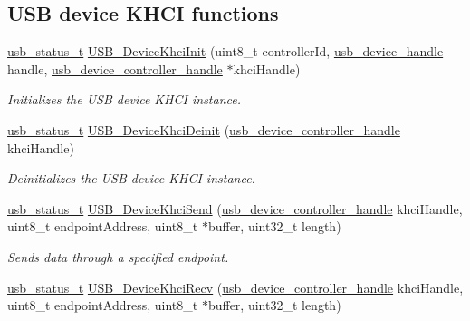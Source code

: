 \subsection*{U\-S\-B device K\-H\-C\-I functions}
\begin{DoxyCompactItemize}
\item 
\hyperlink{group__usb__drv_ga3172b9f50553fb6d8aa2823d10a39c58}{usb\-\_\-status\-\_\-t} \hyperlink{group__usb__device__controller__khci__driver_gad9e6ecba752b0253547e3d57b7b8ea15}{U\-S\-B\-\_\-\-Device\-Khci\-Init} (uint8\-\_\-t controller\-Id, \hyperlink{group__usb__drv_gae62132dc6e5eba994f8aa56cb7399abc}{usb\-\_\-device\-\_\-handle} handle, \hyperlink{group__usb__device__controller__driver_gaec03ce2e4732aa876cd2a91cf8e93b5b}{usb\-\_\-device\-\_\-controller\-\_\-handle} $\ast$khci\-Handle)
\begin{DoxyCompactList}\small\item\em Initializes the U\-S\-B device K\-H\-C\-I instance. \end{DoxyCompactList}\item 
\hyperlink{group__usb__drv_ga3172b9f50553fb6d8aa2823d10a39c58}{usb\-\_\-status\-\_\-t} \hyperlink{group__usb__device__controller__khci__driver_gaeca0b3ce2863e004da6f749ebaeed21d}{U\-S\-B\-\_\-\-Device\-Khci\-Deinit} (\hyperlink{group__usb__device__controller__driver_gaec03ce2e4732aa876cd2a91cf8e93b5b}{usb\-\_\-device\-\_\-controller\-\_\-handle} khci\-Handle)
\begin{DoxyCompactList}\small\item\em Deinitializes the U\-S\-B device K\-H\-C\-I instance. \end{DoxyCompactList}\item 
\hyperlink{group__usb__drv_ga3172b9f50553fb6d8aa2823d10a39c58}{usb\-\_\-status\-\_\-t} \hyperlink{group__usb__device__controller__khci__driver_gae85f89ac73253f83952f2a2b04211932}{U\-S\-B\-\_\-\-Device\-Khci\-Send} (\hyperlink{group__usb__device__controller__driver_gaec03ce2e4732aa876cd2a91cf8e93b5b}{usb\-\_\-device\-\_\-controller\-\_\-handle} khci\-Handle, uint8\-\_\-t endpoint\-Address, uint8\-\_\-t $\ast$buffer, uint32\-\_\-t length)
\begin{DoxyCompactList}\small\item\em Sends data through a specified endpoint. \end{DoxyCompactList}\item 
\hyperlink{group__usb__drv_ga3172b9f50553fb6d8aa2823d10a39c58}{usb\-\_\-status\-\_\-t} \hyperlink{group__usb__device__controller__khci__driver_ga5ab67ead189ef8a325de9db7d4025a32}{U\-S\-B\-\_\-\-Device\-Khci\-Recv} (\hyperlink{group__usb__device__controller__driver_gaec03ce2e4732aa876cd2a91cf8e93b5b}{usb\-\_\-device\-\_\-controller\-\_\-handle} khci\-Handle, uint8\-\_\-t endpoint\-Address, uint8\-\_\-t $\ast$buffer, uint32\-\_\-t length)

\end{DoxyCompactItemize}
